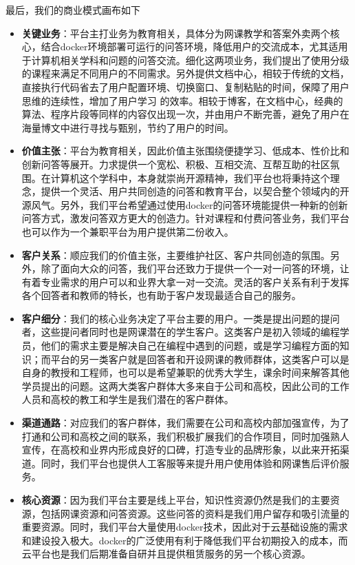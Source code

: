 \documentclass[a4paper]{ctexart}
\begin{document}
最后，我们的商业模式画布如下

\begin{itemize}
  \item \textbf{关键业务}：平台主打业务为教育相关，具体分为网课教学和答案外卖两个核心，结合docker环境部署可运行的问答环境，降低用户的交流成本，尤其适用于计算机相关学科和问题的问答交流。细化这两项业务，我们提出了使用分级的课程来满足不同用户的不同需求。另外提供文档中心，相较于传统的文档，直接执行代码省去了用户配置环境、切换窗口、复制粘贴的时间，保障了用户思维的连续性，增加了用户学习 的效率。相较于博客，在文档中心，经典的算法、程序片段等同样的内容仅出现一次，并由用户不断完善，避免了用户在海量博文中进行寻找与甄别，节约了用户的时间。
  \item \textbf{价值主张}：平台为教育相关，因此价值主张围绕便捷学习、低成本、性价比和创新问答等展开。力求提供一个宽松、积极、互相交流、互帮互助的社区氛围。在计算机这个学科中，本身就崇尚开源精神，我们平台也将秉持这个理念，提供一个灵活、用户共同创造的问答和教育平台，以契合整个领域内的开源风气。另外，我们平台希望通过使用docker的问答环境能提供一种新的创新问答方式，激发问答双方更大的创造力。针对课程和付费问答业务，我们平台也可以作为一个兼职平台为用户提供第二份收入。
  \item \textbf{客户关系}：顺应我们的价值主张，主要维护社区、客户共同创造的氛围。另外，除了面向大众的问答，我们平台还致力于提供一个一对一问答的环境，让有着专业需求的用户可以和业界大拿一对一交流。灵活的客户关系有利于发挥各个回答者和教师的特长，也有助于客户发现最适合自己的服务。
  \item \textbf{客户细分}：我们的核心业务决定了平台主要的用户。一类是提出问题的提问者，这些提问者同时也是网课潜在的学生客户。这类客户是初入领域的编程学员，他们的需求主要是解决自己在编程中遇到的问题，或是学习编程方面的知识；而平台的另一类客户就是回答者和开设网课的教师群体，这类客户可以是自身的教授和工程师，也可以是希望兼职的优秀大学生，课余时间来解答其他学员提出的问题。这两大类客户群体大多来自于公司和高校，因此公司的工作人员和高校的教工和学生是我们潜在的客户群体。
  \item \textbf{渠道通路}：对应我们的客户群体，我们需要在公司和高校内部加强宣传，为了打通和公司和高校之间的联系，我们积极扩展我们的合作项目，同时加强熟人宣传，在高校和业界内形成良好的口碑，打造专业的品牌形象，以此来开拓渠道。同时，我们平台也提供人工客服等来提升用户使用体验和网课售后评价服务。
  \item \textbf{核心资源}：因为我们平台主要是线上平台，知识性资源仍然是我们的主要资源，包括网课资源和问答资源。这些问答的资料是我们用户留存和吸引流量的重要资源。同时，我们平台大量使用docker技术，因此对于云基础设施的需求和建设投入极大。docker的广泛使用有利于降低我们平台初期投入的成本，而云平台也是我们后期准备自研并且提供租赁服务的另一个核心资源。

\end{itemize}
\end{document}

